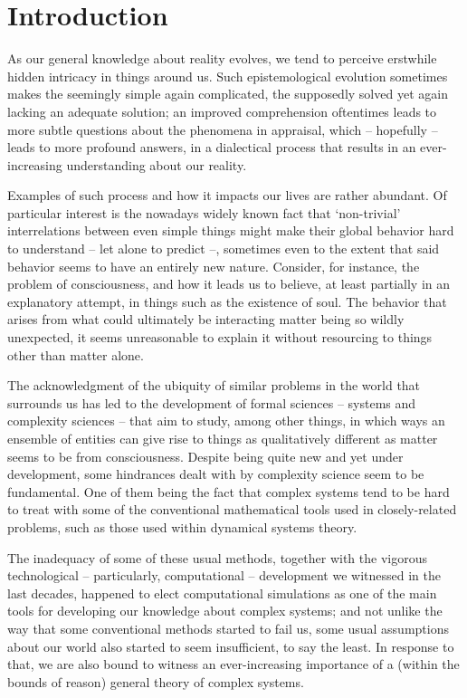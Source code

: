 \section{Introduction}

As our general knowledge about reality evolves, we tend to perceive erstwhile hidden intricacy in things around us. Such epistemological evolution sometimes makes the seemingly simple again complicated, the supposedly solved yet again lacking an adequate solution; an improved comprehension oftentimes leads to more subtle questions about the phenomena in appraisal, which -- hopefully -- leads to more profound answers, in a dialectical process that results in an ever-increasing understanding about our reality.

Examples of such process and how it impacts our lives are rather abundant. Of particular interest is the nowadays widely known fact that `non-trivial' interrelations between even simple things might make their global behavior hard to understand -- let alone to predict --, sometimes even to the extent that said behavior seems to have an entirely new nature. Consider, for instance, the problem of consciousness, and how it leads us to believe, at least partially in an explanatory attempt, in things such as the existence of soul. The behavior that arises from what could ultimately be interacting matter being so wildly unexpected, it seems unreasonable to explain it without resourcing to things other than matter alone. 

The acknowledgment of the ubiquity of similar problems in the world that surrounds us has led to the development of formal sciences -- systems and complexity sciences -- that aim to study, among other things, in which ways an ensemble of entities can give rise to things as qualitatively different as matter seems to be from consciousness. Despite being quite new and yet under development, some hindrances dealt with by complexity science seem to be fundamental. One of them being the fact that complex systems tend to be hard to treat with some of the conventional mathematical tools used in closely-related problems, such as those used within dynamical systems theory. 

The inadequacy of some of these usual methods, together with the vigorous technological -- particularly, computational -- development we witnessed in the last decades, happened to elect computational simulations as one of the main tools for developing our knowledge about complex systems; and not unlike the way that some conventional methods started to fail us, some usual assumptions about our world also started to seem insufficient, to say the least. In response to that, we are also bound to witness an ever-increasing importance of a (within the bounds of reason) general theory of complex systems.

